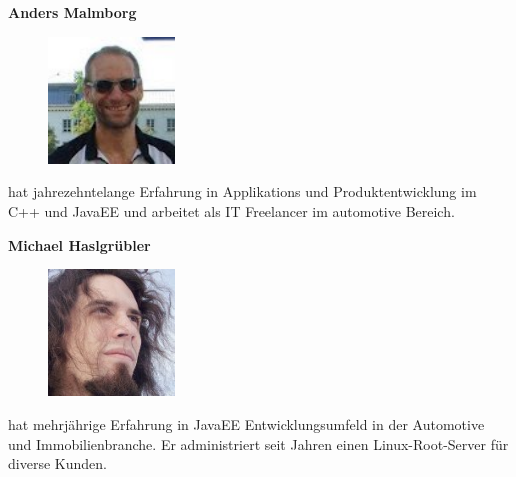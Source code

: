 \documentclass[12pt,a4paper,ngerman]{article}
\begin{document}
\newcommand{\authorboxheight}{5cm}
\begin{minipage}[t][\authorboxheight]{0.45\textwidth}
\textbf{Anders Malmborg}
\vskip0.3cm
\begin{figure}
\vspace{-20pt}
\includegraphics[width=0.3\textwidth]{images/anders.jpg}
\vspace{-20pt}
\end{figure}
hat jahrezehntelange Erfahrung in Applikations und Produktentwicklung im C++ und JavaEE  und arbeitet als IT Freelancer im automotive Bereich. 
\end{minipage}
\hspace{0.1\textwidth}
\begin{minipage}[t][\authorboxheight]{0.45\textwidth}
\textbf{Michael Haslgrübler}
\vskip0.3cm
\begin{figure}
\vspace{-20pt}
\includegraphics[width=0.3\textwidth]{images/michael.jpg}
\vspace{-20pt}
\end{figure}
hat mehrjährige Erfahrung in JavaEE Entwicklungsumfeld in der Automotive und Immobilienbranche. Er administriert seit Jahren einen Linux-Root-Server für diverse Kunden.
\end{minipage}



\end{document}
